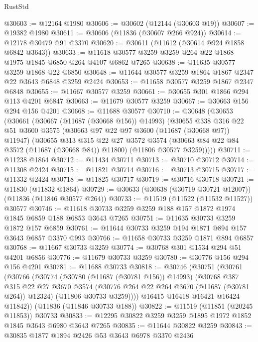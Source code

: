 \begin{lexlean}{RustStd}
\begin{coremodule}
@30603 := @12164 @1980
@30606 := @30602 (@12144 (@30603 @19))
@30607 := @19382 @1980
@30611 := @30606 (@11836 (@30607 @266 @924))
@30614 := @12178 @30479 @91 @3370
@30620 := @30611 (@11612 (@30614 @924 @1858 @6842 @3643))
@30633 := @11618 @30577 @3259 @3259 @264 @22 @1868 @1975 @1845 @6850 @264 @4107 @6862 @7265
@30638 := @11635 @30577 @3259 @1868 @22 @6850
@30648 := @11644 @30577 @3259 @1864 @1867 @2347 @22 @3643 @6848 @3259 @2424
@30653 := @11658 @30577 @3259 @1867 @2347 @6848
@30655 := @11667 @30577 @3259
@30661 := @30655 @301 @1866 @294 @113 @4201 @6847
@30663 := @11679 @30577 @3259
@30667 := @30663 @156 @294 @156 @4201
@30668 := @11688 @30577
@30710 := @30648
    (@30653
      (@30661
        (@30667 (@11687 (@30668 @156)) @14993)
        (@30655
          @338
          @316
          @22
          @51
          @3600
          @3575
          (@30663 @97 @22 @97 @3600 (@11687 (@30668 @97)) @11947)
          (@30655
            @313
            @315
            @22
            @27
            @3572
            @3574
            (@30663 @84 @22 @84 @3572 (@11687 (@30668 @84)) @11800)
            (@11806 @30577 @3259)))))
@30711 := @11238 @1864
@30712 := @11434 @30711
@30713 := @30710 @30712
@30714 := @11308 @2424
@30715 := @11821 @30714
@30716 := @30713 @30715
@30717 := @11332 @2424
@30718 := @11825 @30717
@30719 := @30716 @30718
@30721 := @11830 (@11832 @1864)
@30729 := @30633 (@30638 (@30719 @30721 @12007)) (@11836 (@11846 @30577 @264))
@30733 := @11519 (@11522 (@11532 @11527)) @30577
@30746 := @11618 @30733 @3259 @3259 @188 @157 @1872 @1974 @1845 @6859 @188 @6853 @3643 @7265
@30751 := @11635 @30733 @3259 @1872 @157 @6859
@30761 := @11644 @30733 @3259 @194 @1871 @894 @157 @3643 @6857 @3370 @993
@30766 := @11658 @30733 @3259 @1871 @894 @6857
@30768 := @11667 @30733 @3259
@30774 := @30768 @301 @1534 @294 @51 @4201 @6856
@30776 := @11679 @30733 @3259
@30780 := @30776 @156 @294 @156 @4201
@30781 := @11688 @30733
@30818 := @30746
    (@30751
      (@30761
        (@30766
          (@30774
            (@30780 (@11687 (@30781 @156)) @14993)
            (@30768
              @387
              @315
              @22
              @27
              @3670
              @3574
              (@30776 @264 @22 @264 @3670 (@11687 (@30781 @264)) @12324)
              (@11806 @30733 @3259))))
        @16415
        @16418
        @16421
        @16424
        @11842))
    (@11836 (@11846 @30733 @188))
@30822 := @11519 (@11851 (@20245 @11853)) @30733
@30833 := @12295 @30822 @3259 @3259 @1895 @1972 @1852 @1845 @3643 @6980 @3643 @7265
@30835 := @11644 @30822 @3259
@30843 := @30835 @1877 @1894 @2426 @53 @3643 @6978 @3370 @2436

\end{coremodule}
\end{lexlean}
